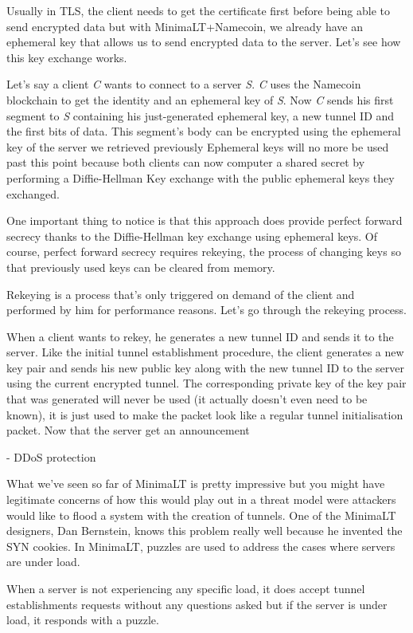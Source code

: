\documentclass{vldb}
\begin{document}
Usually in TLS, the client needs to get the certificate first before being able to send encrypted data but with MinimaLT+Namecoin, we already have an ephemeral key that allows us to send encrypted data to the server. Let's see how this key exchange works.

Let's say a client \emph{C} wants to connect to a server \emph{S}. \emph{C} uses the Namecoin blockchain to get the identity and an ephemeral key of \emph{S}. Now \emph{C} sends his first segment to \emph{S} containing his just-generated ephemeral key, a new tunnel ID and the first bits of data. This segment's body can be encrypted using the ephemeral key of the server we retrieved previously Ephemeral keys will no more be used past this point because both clients can now computer a shared secret by performing a Diffie-Hellman Key exchange with the public ephemeral keys they exchanged. 

One important thing to notice is that this approach does provide perfect forward secrecy thanks to the Diffie-Hellman key exchange using ephemeral keys. Of course, perfect forward secrecy requires rekeying, the process of changing keys so that previously used keys can be cleared from memory.

Rekeying is a process that's only triggered on demand of the client and performed by him for performance reasons. Let's go through the rekeying process. 

When a client wants to rekey, he generates a new tunnel ID and sends it to the server. Like the initial tunnel establishment procedure, the client generates a new key pair and sends his new public key along with the new tunnel ID to the server using the current encrypted tunnel. The corresponding private key of the key pair that was generated will never be used (it actually doesn't even need to be known), it is just used to make the packet look like a regular tunnel initialisation packet. Now that the server get an announcement   

- DDoS protection

What we've seen so far of MinimaLT is pretty impressive but you might have legitimate concerns of how this would play out in a threat model were attackers would like to flood a system with the creation of tunnels. One of the MinimaLT designers, Dan Bernstein, knows this problem really well because he invented the SYN cookies. In MinimaLT, puzzles are used to address the cases where servers are under load.

When a server is not experiencing any specific load, it does accept tunnel establishments requests without any questions asked but if the server is under load, it responds with a puzzle. 
\end{document}
